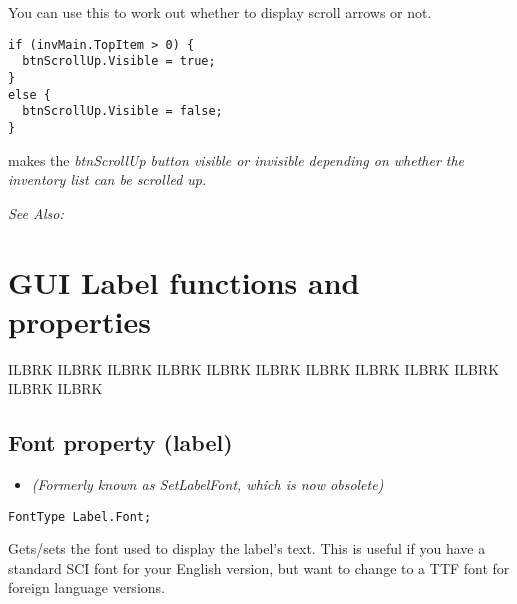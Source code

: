 You can use this to work out whether to display scroll arrows or not.

\begin{verbatim}
if (invMain.TopItem > 0) {
  btnScrollUp.Visible = true;
}
else {
  btnScrollUp.Visible = false;
}
\end{verbatim}
makes the \it{btnScrollUp} button visible or invisible depending on whether the
inventory list can be scrolled up.

\it{See Also:} 



\section{GUI Label functions and properties}%

ILBRK
ILBRK
ILBRK
ILBRK
ILBRK
ILBRK
ILBRK
ILBRK
ILBRK
ILBRK
ILBRK
ILBRK


\subsection{Font property (label)}\label{Label.Font}%

\begin{itemize}
\item \it{(Formerly known as SetLabelFont, which is now obsolete)}
\end{itemize}

\begin{verbatim}
FontType Label.Font;
\end{verbatim}
Gets/sets the font used to display the label's text. This is useful if you
have a standard SCI font for your English version, but want to change to
a TTF font for foreign language versions.

